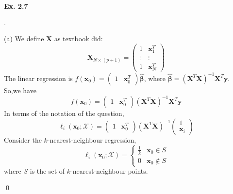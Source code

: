 \documentclass[12pt]{article}
\newenvironment{sol}
  {\par\vspace{3mm}\noindent{\it Solution}.}
  {\qed}
\begin{document}
\begin{flushleft}
\textbf{Ex. 2.7}
\end{flushleft}
\begin{sol}
\begin{flushleft}
(a) We define $\bm{X}$ as textbook did:
$$\bm{X}_{N\times (p+1)}=\left(\begin{matrix}
1 & \bm{x}_1^T \\
\vdots & \vdots \\
1 & \bm{x}_N^T
\end{matrix} \right) $$
The linear regression is $\hat{f}(\bm{x}_0)=\left(\begin{matrix}
1 & \bm{x}_0^T\end{matrix}\right)\bm{\hat{\beta}}$, where $\hat{\bm{\beta}}=(\bm{X}^T\bm{X})^{-1}\bm{X}^T\bm{y}$.\\
So,we have $$\hat{f}(\bm{x}_0)=\left(\begin{matrix}
1 & \bm{x}_0^T\end{matrix}\right)(\bm{X}^T\bm{X})^{-1}\bm{X}^T\bm{y}$$
In terms of the notation of the question,$$\ell _i(\bm{x}_0;\mathcal{X})=\left(\begin{matrix}
1 & \bm{x}_0^T\end{matrix}\right)(\bm{X}^T\bm{X})^{-1}\left(\begin{matrix}
1 \\
\bm{x}_i
\end{matrix}\right) $$
Consider the $k$-nearest-neighbour regression,
$$
\ell _i(\bm{x}_0;\mathcal{X})=\begin{cases}
\frac{1}{k} & \bm{x}_0\in S \\
0 & \bm{x}_0\notin S
\end{cases}
$$
where $S$ is the set of $k$-nearest-neighbour points.


\end{flushleft}
\end{sol}
\end{document}
